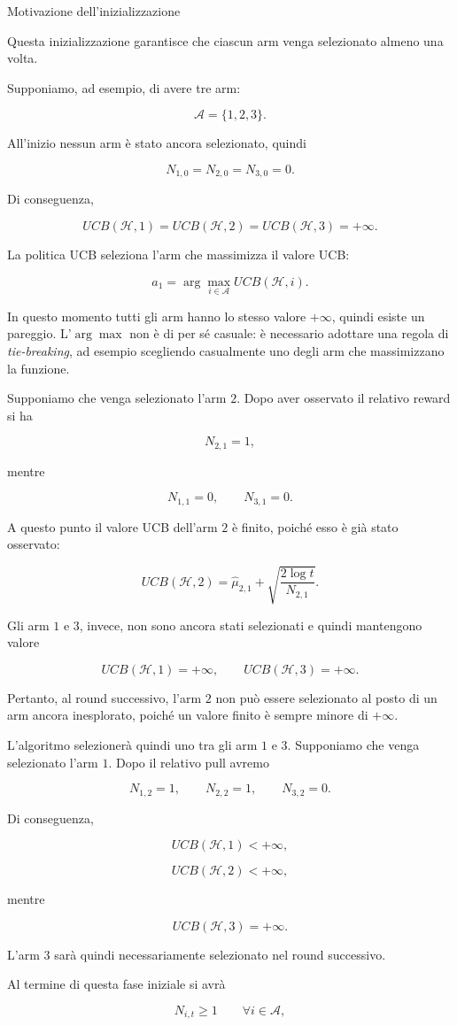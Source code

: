 \begin{observation}{Motivazione dell'inizializzazione}

Questa inizializzazione garantisce che ciascun arm venga selezionato almeno una volta.

Supponiamo, ad esempio, di avere tre arm:

\[
\mathcal A=\{1,2,3\}.
\]

All'inizio nessun arm è stato ancora selezionato, quindi

\[
N_{1,0}=N_{2,0}=N_{3,0}=0.
\]

Di conseguenza,

\[
UCB(\mathcal H,1)
=
UCB(\mathcal H,2)
=
UCB(\mathcal H,3)
=
+\infty.
\]

La politica UCB seleziona l'arm che massimizza il valore UCB:

\[
a_1
=
\arg\max_{i\in\mathcal A}
UCB(\mathcal H,i).
\]

In questo momento tutti gli arm hanno lo stesso valore $+\infty$, quindi esiste un pareggio. L'$\arg\max$ non è di per sé casuale: è necessario adottare una regola di \emph{tie-breaking}, ad esempio scegliendo casualmente uno degli arm che massimizzano la funzione.

Supponiamo che venga selezionato l'arm $2$. Dopo aver osservato il relativo reward si ha

\[
N_{2,1}=1,
\]

mentre

\[
N_{1,1}=0,
\qquad
N_{3,1}=0.
\]

A questo punto il valore UCB dell'arm $2$ è finito, poiché esso è già stato osservato:

\[
UCB(\mathcal H,2)
=
\widehat{\mu}_{2,1}
+
\sqrt{
\frac{2\log t}{N_{2,1}}
}.
\]

Gli arm $1$ e $3$, invece, non sono ancora stati selezionati e quindi mantengono valore

\[
UCB(\mathcal H,1)=+\infty,
\qquad
UCB(\mathcal H,3)=+\infty.
\]

Pertanto, al round successivo, l'arm $2$ non può essere selezionato al posto di un arm ancora inesplorato, poiché un valore finito è sempre minore di $+\infty$.

L'algoritmo selezionerà quindi uno tra gli arm $1$ e $3$. Supponiamo che venga selezionato l'arm $1$. Dopo il relativo pull avremo

\[
N_{1,2}=1,
\qquad
N_{2,2}=1,
\qquad
N_{3,2}=0.
\]

Di conseguenza,

\[
UCB(\mathcal H,1)<+\infty,
\]

\[
UCB(\mathcal H,2)<+\infty,
\]

mentre

\[
UCB(\mathcal H,3)=+\infty.
\]

L'arm $3$ sarà quindi necessariamente selezionato nel round successivo.

Al termine di questa fase iniziale si avrà

\[
N_{i,t}\geq 1
\qquad
\forall i\in\mathcal A,
\]

\end{observation}

